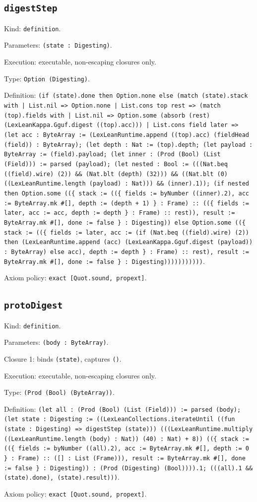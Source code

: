 \documentclass[11pt]{article}
\begin{document}
\subsection*{\texttt{digestStep}}
\noindent Kind: \texttt{definition}.\par
\noindent Parameters: \texttt{(state : Digesting)}.\par
\noindent Execution: executable, non-escaping closures only.\par
\noindent Type: \texttt{Option (Digesting)}.\par
\noindent Definition: \texttt{(if (state).done then Option.none else (match (state).stack with | List.nil => Option.none | List.cons top rest => (match (top).fields with | List.nil => Option.some (absorb (rest) (LexLeanKappa.Gguf.digest ((top).acc))) | List.cons field later => (let acc : ByteArray := (LexLeanRuntime.append ((top).acc) (fieldHead (field)) : ByteArray); (let depth : Nat := (top).depth; (let payload : ByteArray := (field).payload; (let inner : (Prod (Bool) (List (Field))) := parsed (payload); (let nested : Bool := (((Nat.beq ((field).wire) (2)) \&\& (Nat.blt (depth) (32))) \&\& ((Nat.blt (0) ((LexLeanRuntime.length (payload) : Nat))) \&\& (inner).1)); (if nested then Option.some ((\{ stack := ((\{ fields := byNumber ((inner).2), acc := ByteArray.mk \#[], depth := (depth + 1) \} : Frame) :: ((\{ fields := later, acc := acc, depth := depth \} : Frame) :: rest)), result := ByteArray.mk \#[], done := false \} : Digesting)) else Option.some ((\{ stack := ((\{ fields := later, acc := (if (Nat.beq ((field).wire) (2)) then (LexLeanRuntime.append (acc) (LexLeanKappa.Gguf.digest (payload)) : ByteArray) else acc), depth := depth \} : Frame) :: rest), result := ByteArray.mk \#[], done := false \} : Digesting)))))))))))}.\par
\noindent Axiom policy: \texttt{exact [Quot.sound, propext]}.\par
\subsection*{\texttt{protoDigest}}
\noindent Kind: \texttt{definition}.\par
\noindent Parameters: \texttt{(body : ByteArray)}.\par
\noindent Closure 1: binds \texttt{(state)}, captures \texttt{()}.\par
\noindent Execution: executable, non-escaping closures only.\par
\noindent Type: \texttt{(Prod (Bool) (ByteArray))}.\par
\noindent Definition: \texttt{(let all : (Prod (Bool) (List (Field))) := parsed (body); (let state : Digesting := ((LexLeanCollections.iterateUntil ((fun (state : Digesting) => digestStep (state))) (((LexLeanRuntime.multiply ((LexLeanRuntime.length (body) : Nat)) (40) : Nat) + 8)) ((\{ stack := ((\{ fields := byNumber ((all).2), acc := ByteArray.mk \#[], depth := 0 \} : Frame) :: ([] : List (Frame))), result := ByteArray.mk \#[], done := false \} : Digesting)) : (Prod (Digesting) (Bool)))).1; (((all).1 \&\& (state).done), (state).result)))}.\par
\noindent Axiom policy: \texttt{exact [Quot.sound, propext]}.\par
\end{document}
